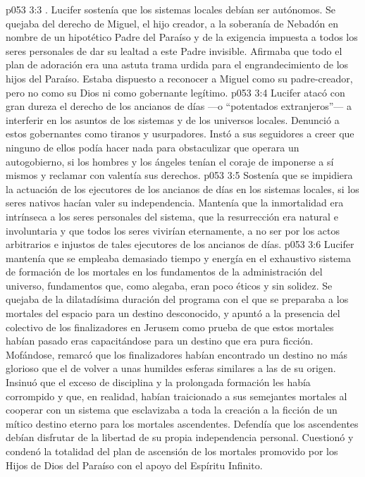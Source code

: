 \vs p053 3:3 . Lucifer sostenía que los sistemas locales debían ser autónomos. Se quejaba del derecho de Miguel, el hijo creador, a la soberanía de Nebadón en nombre de un hipotético Padre del Paraíso y de la exigencia impuesta a todos los seres personales de dar su lealtad a este Padre invisible. Afirmaba que todo el plan de adoración era una astuta trama urdida para el engrandecimiento de los hijos del Paraíso. Estaba dispuesto a reconocer a Miguel como su padre\hyp{}creador, pero no como su Dios ni como gobernante legítimo.
\vs p053 3:4 Lucifer atacó con gran dureza el derecho de los ancianos de días ---o “potentados extranjeros”--- a interferir en los asuntos de los sistemas y de los universos locales. Denunció a estos gobernantes como tiranos y usurpadores. Instó a sus seguidores a creer que ninguno de ellos podía hacer nada para obstaculizar que operara un autogobierno, si los hombres y los ángeles tenían el coraje de imponerse a sí mismos y reclamar con valentía sus derechos.
\vs p053 3:5 Sostenía que se impidiera la actuación de los ejecutores de los ancianos de días en los sistemas locales, si los seres nativos hacían valer su independencia. Mantenía que la inmortalidad era intrínseca a los seres personales del sistema, que la resurrección era natural e involuntaria y que todos los seres vivirían eternamente, a no ser por los actos arbitrarios e injustos de tales ejecutores de los ancianos de días.
\vs p053 3:6  Lucifer mantenía que se empleaba demasiado tiempo y energía en el exhaustivo sistema de formación de los mortales en los fundamentos de la administración del universo, fundamentos que, como alegaba, eran poco éticos y sin solidez. Se quejaba de la dilatadísima duración del programa con el que se preparaba a los mortales del espacio para un destino desconocido, y apuntó a la presencia del colectivo de los finalizadores en Jerusem como prueba de que estos mortales habían pasado eras capacitándose para un destino que era pura ficción. Mofándose, remarcó que los finalizadores habían encontrado un destino no más glorioso que el de volver a unas humildes esferas similares a las de su origen. Insinuó que el exceso de disciplina y la prolongada formación les había corrompido y que, en realidad, habían traicionado a sus semejantes mortales al cooperar con un sistema que esclavizaba a toda la creación a la ficción de un mítico destino eterno para los mortales ascendentes. Defendía que los ascendentes debían disfrutar de la libertad de su propia independencia personal. Cuestionó y condenó la totalidad del plan de ascensión de los mortales promovido por los Hijos de Dios del Paraíso con el apoyo del Espíritu Infinito.
